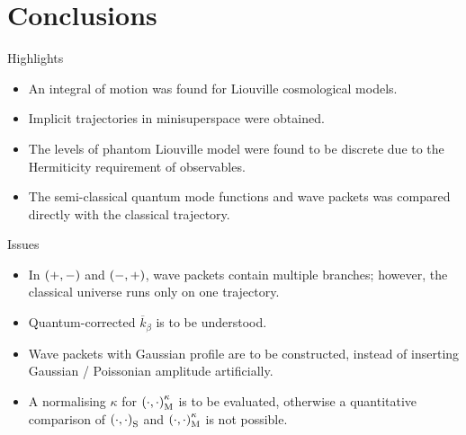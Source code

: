 \documentclass[8pt]{beamer}
\begin{document}
\section{Conclusions}

\begin{frame}%
{Highlights}%
\begin{itemize}
\item An \alert{integral of motion} was found for Liouville cosmological
models.
\item \alert{Implicit trajectories} in minisuperspace were obtained.
\item The levels of phantom Liouville model were found to be \alert{discrete}
due to the Hermiticity requirement of observables.
\item The semi-classical quantum mode functions and wave packets was compared
directly with the classical trajectory.
\end{itemize}
\end{frame}

\begin{frame}%
{Issues}%
\begin{itemize}
\item In ${\left(+,-\right)}$ and ${\left(-,+\right)}$, wave packets contain multiple branches;
however, the classical universe runs only on one trajectory.
\item Quantum-corrected $\overline{k}_\beta$ is to be understood.
\item Wave packets with Gaussian profile are to be constructed, instead of
inserting Gaussian / Poissonian amplitude artificially.
\item A normalising $\kappa$ for ${\left(\cdot,\cdot\right)}_\text{M}^\kappa$ is to be 
evaluated, otherwise a quantitative comparison of
${\left(\cdot,\cdot\right)}_\text{S}$ and ${\left(\cdot,\cdot\right)}_\text{M}^\kappa$ is not
possible.
\end{itemize}
\end{frame}
\end{document}
